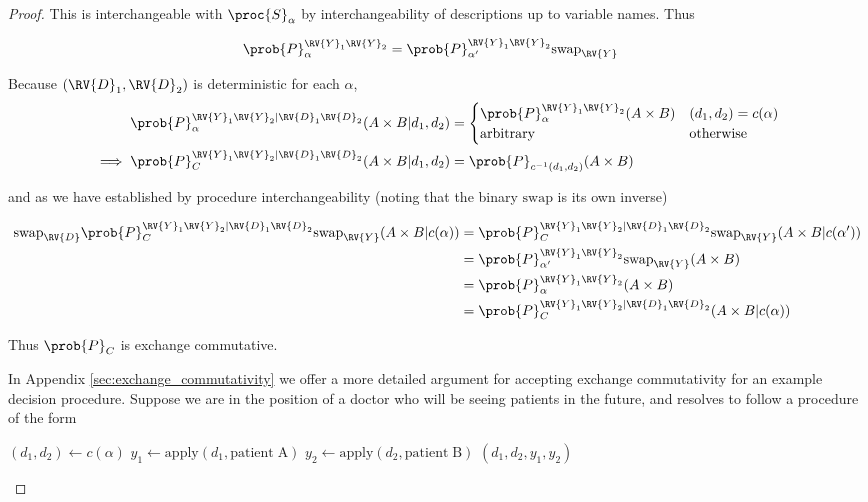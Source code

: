 \begin{proof}
This is interchangeable with $\proc{S}_{\alpha}$ by interchangeability of descriptions up to variable names. Thus

\begin{align}
    \prob{P}_\alpha^{\RV{Y}_1\RV{Y}_2} &= \prob{P}_{\alpha'}^{\RV{Y}_1\RV{Y}_2}\text{swap}_{\RV{Y}}
\end{align}

Because $(\RV{D}_1,\RV{D}_2)$ is deterministic for each $\alpha$,
\begin{align}
    \prob{P}_\alpha^{\RV{Y}_1\RV{Y}_2|\RV{D}_1\RV{D}_2}(A\times B|d_1,d_2) &= \begin{cases}
        \prob{P}_\alpha^{\RV{Y}_1\RV{Y}_2}(A\times B) &(d_1,d_2)=c(\alpha)\\ 
        \mathrm{arbitrary}&\mathrm{otherwise}
    \end{cases} \\
    \implies \prob{P}_C^{\RV{Y}_1\RV{Y}_2|\RV{D}_1\RV{D}_2}(A\times B|d_1,d_2) &= \prob{P}_{c^{-1}(d_1,d_2)}(A\times B)
\end{align}

and as we have established by procedure interchangeability (noting that the binary $\text{swap}$ is its own inverse)

\begin{align}
    \text{swap}_{\RV{D}}\prob{P}_C^{\RV{Y}_1\RV{Y}_2|\RV{D}_1\RV{D}_2}\text{swap}_{\RV{Y}}(A\times B|c(\alpha)) &= \prob{P}_{C}^{\RV{Y}_1\RV{Y}_2|\RV{D}_1\RV{D}_2}\text{swap}_{\RV{Y}}(A\times B|c(\alpha'))\\
    &= \prob{P}_{\alpha'}^{\RV{Y}_1\RV{Y}_2}\text{swap}_{\RV{Y}}(A\times B)\\
    &= \prob{P}_\alpha^{\RV{Y}_1\RV{Y}_2}(A\times B)\\
    &= \prob{P}_C^{\RV{Y}_1\RV{Y}_2|\RV{D}_1\RV{D}_2}(A\times B|c(\alpha))
\end{align}

Thus $\prob{P}_C$ is exchange commutative.



In Appendix \ref{sec:exchange_commutativity} we offer a more detailed argument for accepting exchange commutativity for an example decision procedure. Suppose we are in the position of a doctor who will be seeing patients in the future, and resolves to follow a procedure of the form

\begin{algorithmic}
    \State $(d_1,d_2) \gets c(\alpha)$
    \State $y_1\gets \mathrm{apply}(d_1,\mathrm{patient\;A})$
    \State $y_2\gets \mathrm{apply}(d_2,\mathrm{patient\;B})$
    \State \Return $(d_1,d_2,y_1,y_2)$
    \EndProcedure
\end{algorithmic}


\end{proof}
